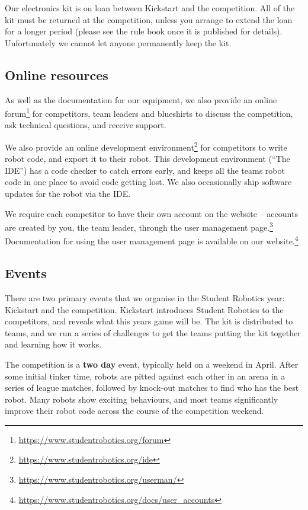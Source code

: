 \documentclass[a4paper]{article}
\begin{document}
Our electronics kit is on loan between Kickstart and the competition. All of the
kit must be returned at the competition, unless you arrange to extend the loan
for a longer period (please see the rule book once it is published for details).
Unfortunately we cannot let anyone permanently keep the kit.

\subsection*{Online resources}

As well as the documentation for our equipment, we also provide an online
forum\footnote{\url{https://www.studentrobotics.org/forum}} for competitors,
team leaders and blueshirts to discuss the competition, ask technical questions,
and receive support.

We also provide an online development
environment\footnote{\url{https://www.studentrobotics.org/ide}} for competitors
to write robot code, and export it to their robot. This development environment
(``The IDE'') has a code checker to catch errors early, and keeps all the
teams robot code in one place to avoid code getting lost. We also occasionally
ship software updates for the robot via the IDE.

We require each competitor to have their
own account on the website -- accounts are created by you, the team leader,
through the user management
page.\footnote{\url{https://www.studentrobotics.org/userman/}} Documentation
for using the user management page is available on our
website.\footnote{\url{https://www.studentrobotics.org/docs/user_accounts}}

\subsection*{Events}

There are two primary events that we organise in the Student Robotics year:
Kickstart and the competition.
Kickstart introduces Student Robotics to the competitors, and reveals what this
years game will be. The kit is distributed to teams, and we run a series of
challenges to get the teams putting the kit together and learning how it works.

The competition is a \textbf{two day} event, typically held on a weekend in
April. After some initial tinker time, robots are pitted against each other in
an arena in a series of league matches, followed by knock-out matches to find
who has the best robot. Many robots show exciting behaviours, and most teams
significantly improve their robot code across the course of the competition
weekend.
\end{document}
